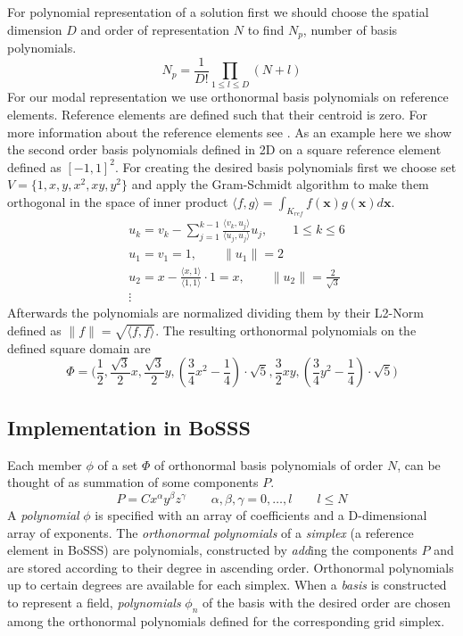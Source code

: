 \documentclass[BoSSSForSolvingConservationLaws.tex]{subfiles}
\begin{document}
For polynomial representation of a solution first we should choose the spatial dimension $D$ and order of representation $N$ to find $N_p$, number of basis polynomials.
\[
N_p=\frac{1}{D!}\prod_{1\le l \le D}(N+l)
\]
For our modal representation we use orthonormal basis polynomials on reference elements. Reference elements are defined such that their centroid is zero. For more information about the reference elements see \cite{KummerLayer2Manual09}. As an example here we show the second order basis polynomials defined in 2D on a square reference element defined as $[-1,1]^2$. For creating the desired basis polynomials first we choose set $V=\{1,x,y,x^2,xy,y^2\}$ and apply the Gram-Schmidt algorithm to make them orthogonal in the space of inner product $\langle f,g \rangle=\int_{K_{ref}} f(\mathbf{x})g(\mathbf{x})d\mathbf{x}$.
\begin{align*}
  &u_k=v_k-\sum_{j=1}^{k-1} \frac{\langle v_k,u_j \rangle}{\langle u_j,u_j \rangle}u_j, \qquad 1\leq k \leq 6\\
  &u_1=v_1=1, \qquad \|u_1\|=2\\
  &u_2=x-\frac{\langle x,1 \rangle}{\langle 1,1 \rangle}\cdot1=x, \qquad \|u_2\|=\frac{2}{\sqrt{3}}\\
  &\vdots
\end{align*}
Afterwards the polynomials are normalized dividing them by their L2-Norm defined as $\|f\|=\sqrt{\langle f,f \rangle}$. The resulting orthonormal polynomials on the defined square domain are
\[
\Phi=\bigg( \frac{1}{2},
    \frac{\sqrt{3}}{2}x,\frac{\sqrt{3}}{2}y,
    (\frac{3}{4}x^2-\frac{1}{4})\cdot\sqrt{5},\frac{3}{2}xy,(\frac{3}{4}y^2-\frac{1}{4})\cdot\sqrt{5}
  \bigg)
\]

\subsection*{Implementation in BoSSS}
Each member $\phi$ of a set $\Phi$ of orthonormal basis polynomials of order $N$, can be thought of as summation of some components $P$.
\[
P=C x^\alpha y^\beta z^\gamma \qquad \alpha, \beta, \gamma =0,\dots,l \qquad l \leq N
\]
A \emph{polynomial} $\phi$ is specified with an array of coefficients and a D-dimensional array of exponents. The \emph{orthonormal polynomials} of a \emph{simplex} (a reference element in BoSSS) are polynomials, constructed by \emph{add}ing the components $P$ and are stored according to their degree in ascending order. Orthonormal polynomials up to certain degrees are available for each simplex. When a \emph{basis} is constructed to represent a field, \emph{polynomials} $\phi_n$ of the basis with the desired order are chosen among the orthonormal polynomials defined for the corresponding grid simplex.
\end{document}
